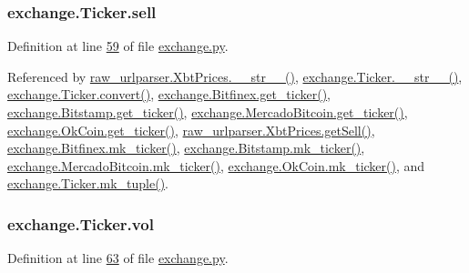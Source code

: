 \subsubsection[{\texorpdfstring{sell}{sell}}]{\setlength{\rightskip}{0pt plus 5cm}exchange.\+Ticker.\+sell}\hypertarget{classexchange_1_1_ticker_a5ba9e257d2ed28f02528a37d9ebd793e}{}\label{classexchange_1_1_ticker_a5ba9e257d2ed28f02528a37d9ebd793e}


Definition at line \hyperlink{exchange_8py_source_l00059}{59} of file \hyperlink{exchange_8py_source}{exchange.\+py}.



Referenced by \hyperlink{raw__urlparser_8py_source_l00074}{raw\+\_\+urlparser.\+Xbt\+Prices.\+\_\+\+\_\+str\+\_\+\+\_\+()}, \hyperlink{exchange_8py_source_l00111}{exchange.\+Ticker.\+\_\+\+\_\+str\+\_\+\+\_\+()}, \hyperlink{exchange_8py_source_l00065}{exchange.\+Ticker.\+convert()}, \hyperlink{exchange_8py_source_l00340}{exchange.\+Bitfinex.\+get\+\_\+ticker()}, \hyperlink{exchange_8py_source_l00409}{exchange.\+Bitstamp.\+get\+\_\+ticker()}, \hyperlink{exchange_8py_source_l00543}{exchange.\+Mercado\+Bitcoin.\+get\+\_\+ticker()}, \hyperlink{exchange_8py_source_l00608}{exchange.\+Ok\+Coin.\+get\+\_\+ticker()}, \hyperlink{raw__urlparser_8py_source_l00065}{raw\+\_\+urlparser.\+Xbt\+Prices.\+get\+Sell()}, \hyperlink{exchange_8py_source_l00354}{exchange.\+Bitfinex.\+mk\+\_\+ticker()}, \hyperlink{exchange_8py_source_l00423}{exchange.\+Bitstamp.\+mk\+\_\+ticker()}, \hyperlink{exchange_8py_source_l00557}{exchange.\+Mercado\+Bitcoin.\+mk\+\_\+ticker()}, \hyperlink{exchange_8py_source_l00622}{exchange.\+Ok\+Coin.\+mk\+\_\+ticker()}, and \hyperlink{exchange_8py_source_l00096}{exchange.\+Ticker.\+mk\+\_\+tuple()}.

\subsubsection[{\texorpdfstring{vol}{vol}}]{\setlength{\rightskip}{0pt plus 5cm}exchange.\+Ticker.\+vol}\hypertarget{classexchange_1_1_ticker_a24c0dd396aebc54c06e429a68c964ea3}{}\label{classexchange_1_1_ticker_a24c0dd396aebc54c06e429a68c964ea3}


Definition at line \hyperlink{exchange_8py_source_l00063}{63} of file \hyperlink{exchange_8py_source}{exchange.\+py}.



